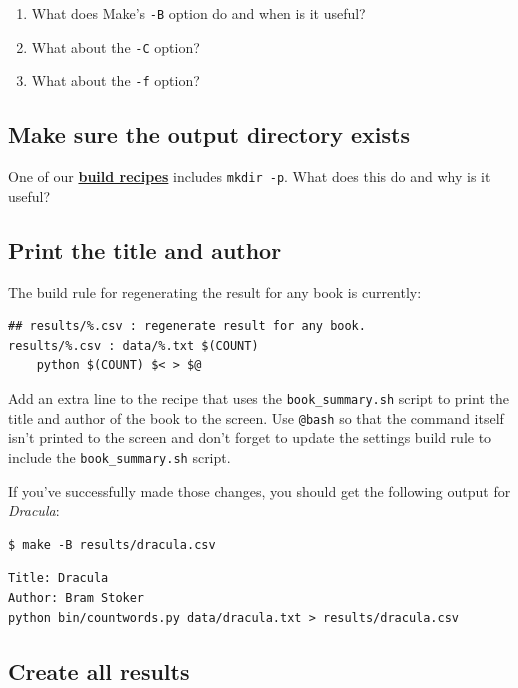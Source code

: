 \documentclass[
]{krantz}
\providecommand{\tightlist}{%
  \setlength{\itemsep}{0pt}\setlength{\parskip}{0pt}}
\newcommand{\gref}[2]{\hyperlink{#2}{\textbf{#1}}}
\begin{document}
\begin{enumerate}
\def\labelenumi{\arabic{enumi}.}
\tightlist
\item
  What does Make's \texttt{-B} option do and when is it useful?
\item
  What about the \texttt{-C} option?
\item
  What about the \texttt{-f} option?
\end{enumerate}

\hypertarget{automate-ex-mkdir}{%
\subsection{Make sure the output directory exists}\label{automate-ex-mkdir}}

One of our \gref{build recipes}{build\_recipe} includes \texttt{mkdir\ -p}.
What does this do and why is it useful?

\hypertarget{automate-ex-print}{%
\subsection{Print the title and author}\label{automate-ex-print}}

The build rule for regenerating the result for any book is currently:

\begin{verbatim}
## results/%.csv : regenerate result for any book.
results/%.csv : data/%.txt $(COUNT)
    python $(COUNT) $< > $@
\end{verbatim}

Add an extra line to the recipe that uses the \texttt{book\_summary.sh} script
to print the title and author of the book to the screen.
Use \texttt{@bash} so that the command itself isn't printed to the screen
and don't forget to update the settings build rule to include the \texttt{book\_summary.sh} script.

If you've successfully made those changes,
you should get the following output for \emph{Dracula}:

\begin{verbatim}
$ make -B results/dracula.csv
\end{verbatim}

\begin{verbatim}
Title: Dracula
Author: Bram Stoker
python bin/countwords.py data/dracula.txt > results/dracula.csv
\end{verbatim}

\hypertarget{automate-ex-all-results}{%
\subsection{Create all results}\label{automate-ex-all-results}}
\end{document}
